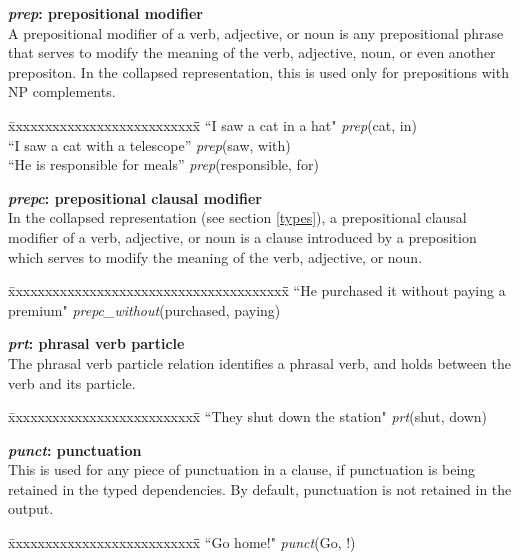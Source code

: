 \documentclass[11pt,letter]{article}
\begin{document}
\noindent\textbf{\emph{prep}: prepositional modifier}\\
A prepositional modifier of a verb, adjective, or noun is any prepositional phrase that serves to modify the meaning of the verb, adjective, noun, or even another prepositon.  In the collapsed representation, this is used only for prepositions with NP complements.
\begin{tabbing}
\hspace{1cm} \= xxxxxxxxxxxxxxxxxxxxxxxxxx\= \hspace{.5cm}\=  \kill
\>  ``I saw a cat in a hat" \> \> \emph{prep}(cat, in)\\
\> ``I saw a cat with a telescope'' \> \> \emph{prep}(saw, with)\\
\> ``He is responsible for meals'' \> \> \emph{prep}(responsible, for)\\
\end{tabbing}

\noindent\textbf{\emph{prepc}: prepositional clausal modifier}\\
In the collapsed representation (see section \ref{types}), a prepositional clausal modifier of a verb, adjective, or noun is a clause introduced by a preposition which  serves to modify the meaning of the verb, adjective, or noun.
\begin{tabbing}
\hspace{1cm} \= xxxxxxxxxxxxxxxxxxxxxxxxxxxxxxxxxxxxxx\= \hspace{.5cm}\=  \kill
\>  ``He purchased it without paying a premium" \> \> \emph{prepc\_without}(purchased, paying)\\
\end{tabbing}

\noindent\textbf{\emph{prt}: phrasal verb particle}\\
The phrasal verb particle relation identifies a phrasal verb, and holds between the verb and its particle.
\begin{tabbing}
\hspace{1cm} \= xxxxxxxxxxxxxxxxxxxxxxxxxx\= \hspace{.5cm}\=  \kill
\>  ``They shut down the station" \> \> \emph{prt}(shut, down)\\
\end{tabbing}

\noindent\textbf{\emph{punct}: punctuation}\\
This is used for any piece of punctuation in a clause, if punctuation is being retained in the typed dependencies. By default, punctuation is not retained in the output.
\begin{tabbing}
\hspace{1cm} \= xxxxxxxxxxxxxxxxxxxxxxxxxx\= \hspace{.5cm}\=  \kill
\> ``Go home!" \> \> \emph{punct}(Go, !)\\
\end{tabbing}
\end{document}
